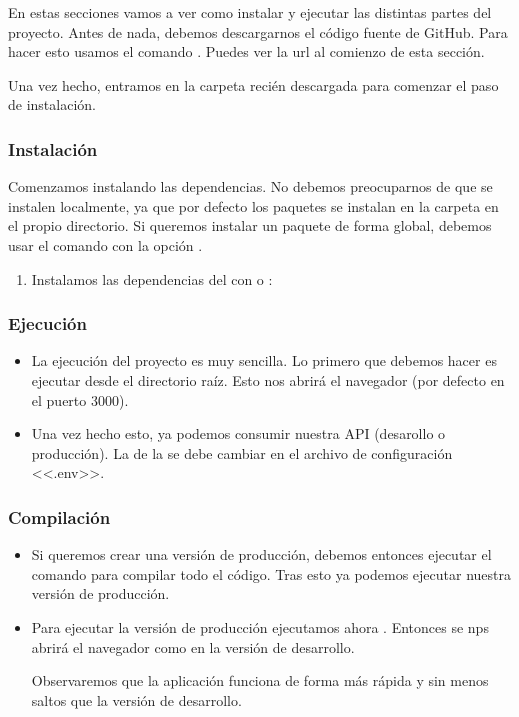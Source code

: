 En estas secciones vamos a ver como instalar y ejecutar las distintas partes del proyecto. Antes de nada, debemos descargarnos el código fuente de GitHub. Para hacer esto usamos el comando . Puedes ver la url al comienzo de esta sección.

Una vez hecho, entramos en la carpeta recién descargada para comenzar el paso de instalación.

\subsubsection{Instalación}

Comenzamos instalando las dependencias. No debemos preocuparnos de que se instalen localmente, ya que por defecto los paquetes se instalan en la carpeta  en el propio directorio. Si queremos instalar un paquete de forma global, debemos usar el comando  con la opción .

\begin{enumerate}
  \item Instalamos las dependencias del  con  o :
\end{enumerate}

\subsubsection{Ejecución}

\begin{itemize}
  \item La ejecución del proyecto es muy sencilla. Lo primero que debemos hacer es ejecutar  desde el directorio raíz. Esto nos abrirá el navegador (por defecto en el puerto 3000).

  \item Una vez hecho esto, ya podemos consumir nuestra API (desarollo o producción). La  de la  se debe cambiar en el archivo de configuración <<.env>>.
\end{itemize}

\subsubsection{Compilación}

\begin{itemize}
  \item Si queremos crear una versión de producción, debemos entonces ejecutar el comando  para compilar todo el código. Tras esto ya podemos ejecutar nuestra versión de producción.

  \item Para ejecutar la versión de producción ejecutamos ahora . Entonces se nps abrirá el navegador como en la versión de desarrollo.

        Observaremos que la aplicación funciona de forma más rápida y sin menos saltos que la versión de desarrollo.
\end{itemize}

